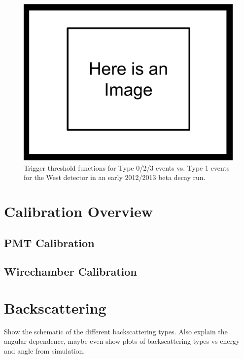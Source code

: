 \begin{figure}[h] \label{fig:evtTypeTriggers}
\centering
\includegraphics[scale=.25]{3-UCNAAnalysis/ImageHolder.pdf}
\caption{Trigger threshold functions for Type 0/2/3 events vs. Type 1 events for the 
West detector in an early 2012/2013 beta decay run. }
\end{figure}



\section{Calibration Overview}

\subsection{PMT Calibration}

\subsection{Wirechamber Calibration}

 
\section{Backscattering} \label{sec:backscattering}

Show the schematic of the different backscattering types. Also explain the 
angular dependence, maybe even show plots of backscattering types vs energy 
and angle from simulation.

